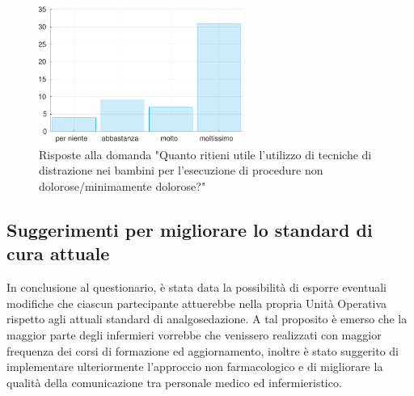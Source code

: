 \begin{figure}[!h]
    \centering
    \includegraphics[width=0.6\textwidth]{Figure/distrazione.pdf}
    \caption{Risposte alla domanda "Quanto ritieni utile l’utilizzo di tecniche di distrazione nei bambini per l’esecuzione di procedure non dolorose/minimamente dolorose?"}
    \label{fig:distrazione}
\end{figure}

\subsection*{Suggerimenti per migliorare lo standard di cura attuale}

In conclusione al questionario, è stata data la possibilità di esporre eventuali modifiche che ciascun partecipante attuerebbe nella propria Unità Operativa rispetto agli attuali standard di analgosedazione. A tal proposito è emerso che la maggior parte degli infermieri vorrebbe che venissero realizzati con maggior frequenza dei corsi di formazione ed aggiornamento, inoltre è stato suggerito di implementare ulteriormente l'approccio non farmacologico e di migliorare la qualità della comunicazione tra personale medico ed infermieristico. 